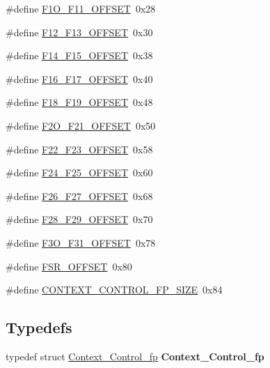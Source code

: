 \begin{DoxyCompactItemize}
\item 
\#define \mbox{\hyperlink{group__RTEMSScoreCPUSPARCContext_ga00a371479d5f5fc729ceaa4426896a8c}{F1\+O\+\_\+\+F11\+\_\+\+O\+F\+F\+S\+ET}}~0x28
\item 
\#define \mbox{\hyperlink{group__RTEMSScoreCPUSPARCContext_gac6d8bfb0dfc29be5765ecd649a073fe0}{F12\+\_\+\+F13\+\_\+\+O\+F\+F\+S\+ET}}~0x30
\item 
\#define \mbox{\hyperlink{group__RTEMSScoreCPUSPARCContext_gaf84133f541f71bd597b7921f71e573dc}{F14\+\_\+\+F15\+\_\+\+O\+F\+F\+S\+ET}}~0x38
\item 
\#define \mbox{\hyperlink{group__RTEMSScoreCPUSPARCContext_gaf95c2c9c2db89e4b60d44e972ec1eac5}{F16\+\_\+\+F17\+\_\+\+O\+F\+F\+S\+ET}}~0x40
\item 
\#define \mbox{\hyperlink{group__RTEMSScoreCPUSPARCContext_ga121cc8834609b99833c42495eb1a40f6}{F18\+\_\+\+F19\+\_\+\+O\+F\+F\+S\+ET}}~0x48
\item 
\#define \mbox{\hyperlink{group__RTEMSScoreCPUSPARCContext_ga209d606e99c0bdf7c38f546eb68cbbe6}{F2\+O\+\_\+\+F21\+\_\+\+O\+F\+F\+S\+ET}}~0x50
\item 
\#define \mbox{\hyperlink{group__RTEMSScoreCPUSPARCContext_ga58b835ae7666415c53fb4588047c4967}{F22\+\_\+\+F23\+\_\+\+O\+F\+F\+S\+ET}}~0x58
\item 
\#define \mbox{\hyperlink{group__RTEMSScoreCPUSPARCContext_ga06165d099fc181bf805ec356a7010b56}{F24\+\_\+\+F25\+\_\+\+O\+F\+F\+S\+ET}}~0x60
\item 
\#define \mbox{\hyperlink{group__RTEMSScoreCPUSPARCContext_gaf48244f68545d2f42726b1ffd8591593}{F26\+\_\+\+F27\+\_\+\+O\+F\+F\+S\+ET}}~0x68
\item 
\#define \mbox{\hyperlink{group__RTEMSScoreCPUSPARCContext_ga3da30fdb70ea0d87df1352782f7a4e51}{F28\+\_\+\+F29\+\_\+\+O\+F\+F\+S\+ET}}~0x70
\item 
\#define \mbox{\hyperlink{group__RTEMSScoreCPUSPARCContext_ga82794a528425acdb1d6e877192617472}{F3\+O\+\_\+\+F31\+\_\+\+O\+F\+F\+S\+ET}}~0x78
\item 
\#define \mbox{\hyperlink{group__RTEMSScoreCPUSPARCContext_ga777b2902214ca25795b2f0903878fc9f}{F\+S\+R\+\_\+\+O\+F\+F\+S\+ET}}~0x80
\item 
\#define \mbox{\hyperlink{group__RTEMSScoreCPUSPARCContext_gabef2b557b9c181976d7c5938b09f22f8}{C\+O\+N\+T\+E\+X\+T\+\_\+\+C\+O\+N\+T\+R\+O\+L\+\_\+\+F\+P\+\_\+\+S\+I\+ZE}}~0x84
\end{DoxyCompactItemize}
\subsection*{Typedefs}
\begin{DoxyCompactItemize}
\item 
\mbox{\label{group__RTEMSScoreCPUSPARCContext_ga131b8fab85e38be11682fd6957e40ead}} 
typedef struct \mbox{\hyperlink{structContext__Control__fp}{Context\+\_\+\+Control\+\_\+fp}} {\bfseries Context\+\_\+\+Control\+\_\+fp}
\end{DoxyCompactItemize}


